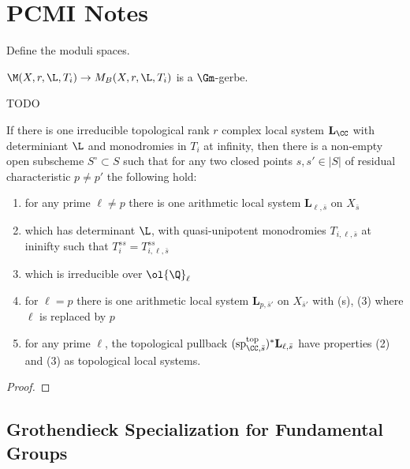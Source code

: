 \documentclass{article}
\newcommand{\LL}{\mathbf{L}}
\renewcommand{\top}{\mathrm{top}}
\begin{document}
\section{PCMI Notes}

Define the moduli spaces.

\begin{prop}
$\M(X, r, \L, T_i) \to M_B(X, r, \L, T_i)$ is a $\Gm$-gerbe. 
\end{prop}

{\color{red} TODO}

\begin{theorem}
If there is one irreducible topological rank $r$ complex local system $\LL_{\CC}$ with determiniant $\L$ and monodromies in $T_i$ at infinity, then there is a non-empty open subscheme $S^\circ \subset S$ such that for any two closed points $s,s' \in |S|$ of residual characteristic $p \neq p'$ the following hold:
\begin{enumerate}
\item for any prime $\ell \neq p$ there is one arithmetic local system $\LL_{\ell, \bar{s}}$ on $X_{\bar{s}}$
\item which has determinant $\L$, with quasi-unipotent monodromies $T_{i,\ell, \bar{s}}$ at ininifty such that $T_i^{ss} = T_{i,\ell, \bar{s}}^{ss}$
\item which is irreducible over $\ol{\Q}_\ell$
\item for $\ell = p$ there is one arithmetic local system $\LL_{p,\bar{s}'}$ on $X_{\bar{s}'}$  with (s), (3) where $\ell$ is replaced by $p$
\item for any prime $\ell$, the topological pullback $(\mathrm{sp}_{\CC,\bar{s}}^{\top})^* \LL_{\ell, \bar{s}}$ have properties (2) and (3) as topological local systems. 
\end{enumerate}
\end{theorem}

\begin{proof}

\end{proof}

\renewcommand{\sp}{\mathrm{sp}}

\subsection{Grothendieck Specialization for Fundamental Groups}
\end{document}
